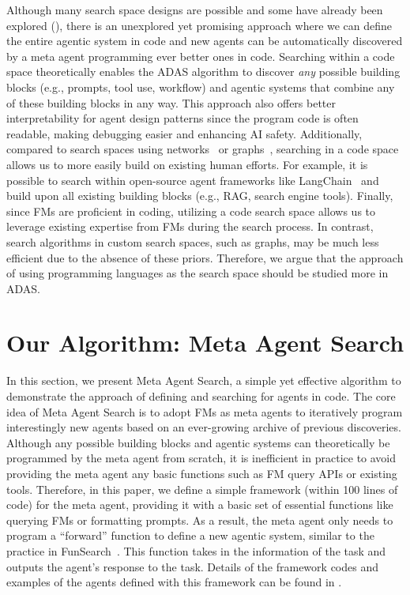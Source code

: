 \documentclass{article} %
\newcommand{\problem}{ADAS\xspace}
\newcommand{\ouralgo}{Meta Agent Search\xspace}
\begin{document}
Although many search space designs are possible and some have already been explored (), there is an unexplored yet promising approach where we can define the entire agentic system in code and new agents can be automatically discovered by a meta agent programming ever better ones in code. Searching within a code space theoretically enables the \problem algorithm to discover \emph{any} possible building blocks (e.g., prompts, tool use, workflow) and agentic systems that combine any of these building blocks in any way. This approach also offers better interpretability for agent design patterns since the program code is often readable, making debugging easier and enhancing AI safety. Additionally, compared to search spaces using networks~\citep{liu2023dynamic} or graphs~\citep{zhugegptswarm}, searching in a code space allows us to more easily build on existing human efforts. For example, it is possible to search within open-source agent frameworks like LangChain~\citep{langchain} and build upon all existing building blocks (e.g., RAG, search engine tools). Finally, since FMs are proficient in coding, utilizing a code search space allows us to leverage existing expertise from FMs during the search process. In contrast, search algorithms in custom search spaces, such as graphs, may be much less efficient due to the absence of these priors.
Therefore, we argue that the approach of using programming languages as the search space should be studied more in \problem. 

\section{Our Algorithm: \ouralgo}
\label{section:method}

In this section, we present \ouralgo, a simple yet effective algorithm to demonstrate the approach of defining and searching for agents in code.
The core idea of \ouralgo is to adopt FMs as meta agents to iteratively program interestingly new agents based on an ever-growing archive of previous discoveries.
Although any possible building blocks and agentic systems can theoretically be programmed by the meta agent from scratch, it is inefficient in practice to avoid providing the meta agent any basic functions such as FM query APIs or existing tools. 
Therefore, in this paper, we define a simple framework (within 100 lines of code) for the meta agent, providing it with a basic set of essential functions like querying FMs or formatting prompts.
As a result, the meta agent only needs to program a ``forward'' function to define a new agentic system, similar to the practice in FunSearch~\citep{romera2024funSearch}.
This function takes in the information of the task and outputs the agent’s response to the task.
Details of the framework codes and examples of the agents defined with this framework can be found in .
\end{document}
